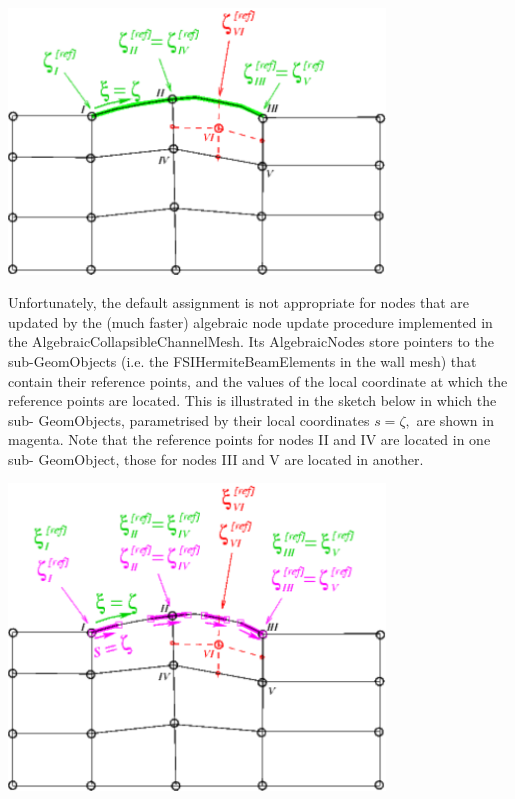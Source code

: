  
\begin{DoxyImage}
\includegraphics[width=0.75\textwidth]{update_single}
\end{DoxyImage}


Unfortunately, the default assignment is not appropriate for nodes that are updated by the (much faster) algebraic node update procedure implemented in the {\ttfamily Algebraic\+Collapsible\+Channel\+Mesh}. Its {\ttfamily Algebraic\+Nodes} store pointers to the sub-\/{\ttfamily Geom\+Objects} (i.\+e. the {\ttfamily F\+S\+I\+Hermite\+Beam\+Elements} in the wall mesh) that contain their reference points, and the values of the local coordinate at which the reference points are located. This is illustrated in the sketch below in which the sub-\/ {\ttfamily Geom\+Objects}, parametrised by their local coordinates $ s = \zeta, $ are shown in magenta. Note that the reference points for nodes II and IV are located in one sub-\/ {\ttfamily Geom\+Object}, those for nodes I\+II and V are located in another.

 
\begin{DoxyImage}
\includegraphics[width=0.75\textwidth]{update_compound}
\end{DoxyImage}


